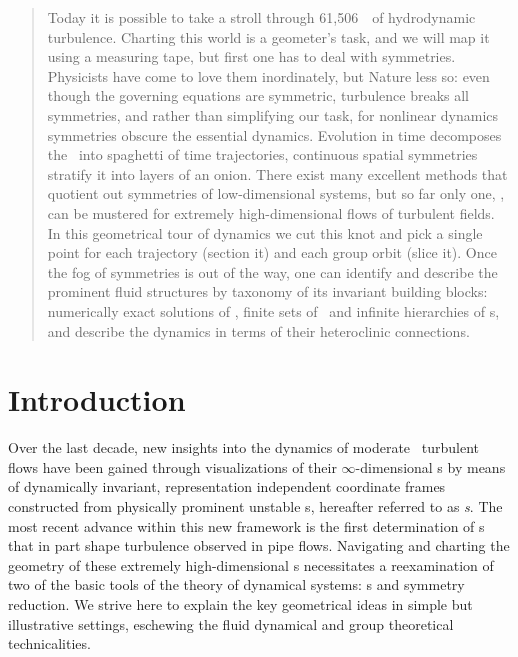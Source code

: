 \documentclass[aip,cha,reprint,
secnumarabic,
nofootinbib, tightenlines,
nobibnotes, showkeys, showpacs,
groupedaddress
]{revtex4-1}
\begin{document}
\begin{quotation}
Today it is possible to take a stroll through 61,506\dmn\ \statesp\ of
hydrodynamic turbulence. Charting this world is a geometer's task, and we
will map it using a measuring tape, but first one has to deal with
symmetries. Physicists have come to love them inordinately, but Nature
less so: even though the governing equations are symmetric, turbulence
breaks all symmetries, and rather than simplifying our task, for
nonlinear dynamics symmetries obscure the essential dynamics. Evolution
in time decomposes the \statesp\ into spaghetti of time trajectories,
continuous spatial symmetries stratify it into layers of an onion. There
exist many excellent methods that quotient out symmetries of
low-dimensional systems, but so far only one, \mslices, can be mustered
for extremely high-dimensional flows of turbulent fields. In this
geometrical tour of dynamics we cut this knot and pick a
single point for each trajectory (section it) and each group orbit (slice
it). Once the fog of symmetries is out of the way, one can identify and
describe the prominent fluid structures by taxonomy of its invariant
building blocks: numerically exact solutions of \NSe, finite sets of
\reqva\ and infinite hierarchies of \rpo s, and describe the dynamics in
terms of their heteroclinic connections.
\end{quotation}

\section{Introduction}
\label{s:intro}


Over the last decade, new insights into the dynamics of moderate
\Reynolds\ turbulent flows have been gained through visualizations of
their $\infty$-dimensional \statesp s by means of dynamically invariant,
representation independent coordinate frames constructed from
physically prominent unstable {\cohStr s}, hereafter referred to as {\em
\template s}.
The most recent advance within this new framework is
the first determination of \rpo s that in part shape turbulence observed
in pipe flows. Navigating and charting the geometry of these
extremely high-dimensional \statesp s necessitates a reexamination of two
of the basic tools of the theory of dynamical systems: \PoincSec s and symmetry
reduction. We strive
here to explain the key geometrical ideas in simple but illustrative
settings, eschewing the fluid dynamical and group theoretical
technicalities.
\end{document}
